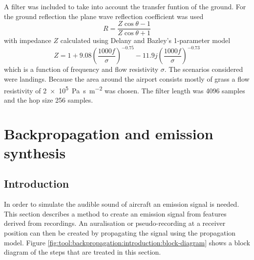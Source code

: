 \documentclass[10pt,twocolumn]{article}
\begin{document}
A filter was included to take into account the transfer funtion of the ground. For
the ground reflection the plane wave reflection coefficient was used
\begin{equation}
 R = \frac{Z\cos{\theta}-1}{Z\cos{\theta}+1}
\end{equation}
with impedance $Z$ calculated using Delany and Bazley's 1-parameter model
\begin{equation}
 Z = 1 + 9.08 \left( \frac{1000f}{\sigma}\right)^{-0.75} - 11.9 j \left( \frac{1000f}{\sigma}\right)^{-0.73}
\end{equation}
which is a function of frequency and flow resistivity $\sigma$. The scenarios
considered were landings. Because the area around the airport consists mostly of grass a
flow resistivity of \SI{2e5}{\pascal\second\per\meter\squared} was chosen. The
filter length was 4096 samples and the hop size 256 samples.

\section{Backpropagation and emission synthesis}

\subsection{Introduction}
In order to
simulate the audible sound of aircraft an emission signal is needed.
This section describes a method to create an emission signal from features derived from
recordings. An auralisation or pseudo-recording at a receiver position can then
be created by propagating the signal using the propagation model. Figure
\ref{fig:tool:backpropagation:introduction:block-diagram} shows a block diagram
of the steps that are treated in this section.
\end{document}
